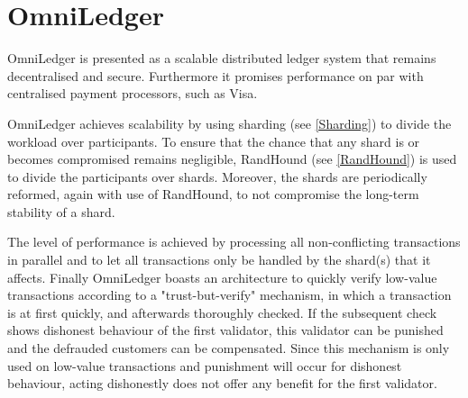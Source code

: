 \section{OmniLedger}
OmniLedger \cite{OmniLedger} is presented as a scalable distributed ledger system that remains decentralised and secure. Furthermore it promises performance on par with centralised payment processors, such as Visa.

OmniLedger achieves scalability by using sharding (see \ref{Sharding}) to divide the workload over participants. To ensure that the chance that any shard is or becomes compromised remains negligible, RandHound (see \ref{RandHound}) is used to divide the participants over shards. Moreover, the shards are periodically reformed, again with use of RandHound, to not compromise the long-term stability of a shard.

The level of performance is achieved by processing all non-conflicting transactions in parallel and to let all transactions only be handled by the shard(s) that it affects.
Finally OmniLedger boasts an architecture to quickly verify low-value transactions according to a "trust-but-verify" mechanism, in which a transaction is at first quickly, and afterwards thoroughly checked. If the subsequent check shows dishonest behaviour of the first validator, this validator can be punished and the defrauded customers can be compensated. Since this mechanism is only used on low-value transactions and punishment will occur for dishonest behaviour, acting dishonestly does not offer any benefit for the first validator.